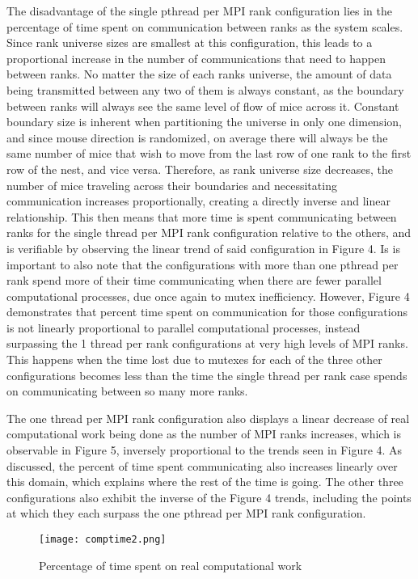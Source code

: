 \documentclass[letterpaper, 10 pt, conference]{ieeeconf}  %
\begin{document}
The disadvantage of the single pthread per MPI rank configuration lies in the percentage of time spent on communication between ranks as the system scales.  Since rank universe sizes are smallest at this configuration, this leads to a proportional increase in the number of communications that need to happen between ranks.  No matter the size of each ranks universe, the amount of data being transmitted between any two of them is always constant, as the boundary between ranks will always see the same level of flow of mice across it.  Constant boundary size is inherent when partitioning the universe in only one dimension, and since mouse direction is randomized, on average there will always be the same number of mice that wish to move from the last row of one rank to the first row of the nest, and vice versa.  Therefore, as rank universe size decreases, the number of mice traveling across their boundaries and necessitating communication increases proportionally, creating a directly inverse and linear relationship.  This then means that more time is spent communicating between ranks for the single thread per MPI rank configuration relative to the others, and is verifiable by observing the linear trend of said configuration in Figure 4.  Is is important to also note that the configurations with more than one pthread per rank spend more of their time communicating when there are fewer parallel computational processes, due once again to mutex inefficiency.  However, Figure 4 demonstrates that percent time spent on communication for those configurations is not linearly proportional to parallel computational processes, instead surpassing the 1 thread per rank configurations at very high levels of MPI ranks.  This happens when the time lost due to mutexes for each of the three other configurations becomes less than the time the single thread per rank case spends on communicating between so many more ranks.  

The one thread per MPI rank configuration also displays a linear decrease of real computational work being done as the number of MPI ranks increases, which is observable in Figure 5, inversely proportional to the trends seen in Figure 4.  As discussed, the percent of time spent communicating also increases linearly over this domain, which explains where the rest of the time is going.  The other three configurations also exhibit the inverse of the Figure 4 trends, including the points at which they each surpass the one pthread per MPI rank configuration.  

\begin{figure}[!htbp]
  \texttt{[image: comptime2.png]}
  \caption{Percentage of time spent on real computational work}
\end{figure}
\end{document}
